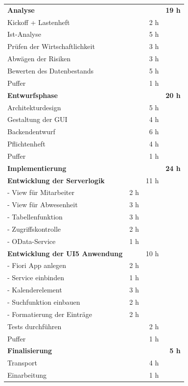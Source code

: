 \begin{tabularx}{\textwidth}{Xrrr}

\rowcolor{heading}\textbf{Analyse} & \textbf{} & \textbf{} & \textbf{19 h} \\
Kickoff + Lastenheft &       & 2 h   &  \\
\rowcolor{odd}Ist-Analyse &       & 5 h   &  \\
Prüfen der Wirtschaftlichkeit &       & 3 h   &  \\
\rowcolor{odd}Abwägen der Risiken &       & 3 h   &  \\
Bewerten des Datenbestands &       & 5 h   &  \\
\rowcolor{odd}Puffer &       & 1 h   &  \\

\rowcolor{heading}\textbf{Entwurfsphase} & \textbf{} & \textbf{} & \textbf{20 h} \\
Architekturdesign &       & 5 h & \\
\rowcolor{odd}Gestaltung der GUI &       & 4 h & \\
Backendentwurf &       & 6 h & \\
\rowcolor{odd}Pflichtenheft &       & 4 h & \\
Puffer &       & 1 h   &  \\

\rowcolor{heading}\textbf{Implementierung} & \textbf{} & \textbf{} & \textbf{24 h} \\
\textbf{Entwicklung der Serverlogik} &       & 11 h & \\ 
\rowcolor{odd}- View für Mitarbeiter & 2 h & & \\ 
- View für Abwesenheit & 3 h & & \\ 
\rowcolor{odd}- Tabellenfunktion & 3 h & & \\ 
- Zugriffskontrolle & 2 h & & \\ 
\rowcolor{odd}- OData-Service & 1 h & & \\ 
\textbf{Entwicklung der UI5 Anwendung} &       & 10 h & \\
\rowcolor{odd}- Fiori App anlegen & 2 h & & \\ 
- Service einbinden & 1 h & & \\ 
\rowcolor{odd}- Kalenderelement & 3 h & & \\ 
- Suchfunktion einbauen & 2 h & & \\ 
\rowcolor{odd}- Formatierung der Einträge & 2 h & & \\ 
Tests durchführen &       & 2 h & \\ 
\rowcolor{odd}Puffer &       & 1 h   &  \\
\rowcolor{heading}\textbf{Finalisierung} & \textbf{} & \textbf{} & \textbf{5 h} \\
Transport &       & 4 h & \\ 
\rowcolor{odd}Einarbeitung &       & 1 h & \\ 


\end{tabularx}
